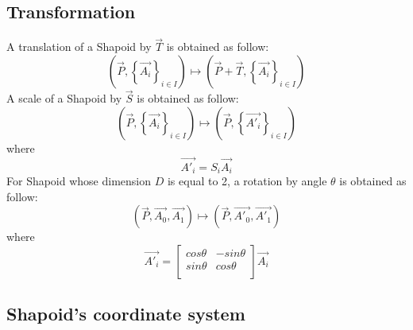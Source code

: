 \subsection{Transformation}

A translation of a Shapoid by $\overrightarrow{T}$ is obtained as follow:\\
\begin{equation}
\left(\overrightarrow{P},\left\lbrace\overrightarrow{A_i}\right\rbrace_{i\in I}\right)\mapsto\left(\overrightarrow{P}+\overrightarrow{T},\left\lbrace\overrightarrow{A_i}\right\rbrace_{i\in I}\right)
\end{equation} 
A scale of a Shapoid by $\overrightarrow{S}$ is obtained as follow:\\
\begin{equation}
\left(\overrightarrow{P},\left\lbrace\overrightarrow{A_i}\right\rbrace_{i\in I}\right)\mapsto\left( \overrightarrow{P},\left\lbrace\overrightarrow{A'_i}\right\rbrace_{i\in I}\right)
\end{equation} 
where
\begin{equation}
\overrightarrow{A'_i}=S_i\overrightarrow{A_i}
\end{equation}
For Shapoid whose dimension $D$ is equal to 2, a rotation by angle $\theta$ is obtained as follow:\\
\begin{equation}
\left(\overrightarrow{P},\overrightarrow{A_0},\overrightarrow{A_1}\right)\mapsto\left(\overrightarrow{P},\overrightarrow{A'_0},\overrightarrow{A'_1}\right)
\end{equation} 
where
\begin{equation}
\overrightarrow{A'_i}=\left[
\begin{array}{cc}
cos\theta&-sin\theta\\
sin\theta&cos\theta\\
\end{array}
\right]
\overrightarrow{A_i}
\end{equation}

\subsection{Shapoid's coordinate system}

